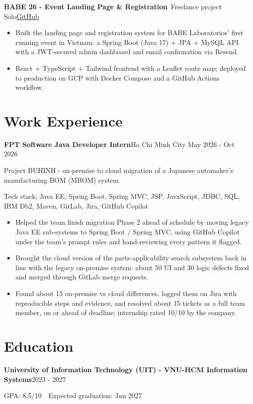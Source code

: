 \documentclass[10pt, a4paper]{article}
\newcommand{\entry}[2]{\textbf{#1}\hfill#2\par}
\newcommand{\subentry}[2]{{\color{MutedText}#1}\hfill{\color{MutedText}#2}\par}
\newcommand{\project}[3]{\textbf{#1}\,{\color{MutedText}\textbar{} #2}\hfill\href{#3}{GitHub}\par}
\newcommand{\techstack}[1]{{\color{MutedText}Tech stack: #1}\par}
\begin{document}
\vspace{2pt}
\project{BABE 26 - Event Landing Page \& Registration}{Freelance project \textbullet{} Solo}{https://github.com/minhphuong150505/landing-page}
\begin{itemize}
  \item Built the landing page and registration system for BABE Laboratorios' first running event in Vietnam: a Spring Boot (Java 17) + JPA + MySQL API with a JWT-secured admin dashboard and email confirmation via Resend.
  \item React + TypeScript + Tailwind frontend with a Leaflet route map; deployed to production on GCP with Docker Compose and a GitHub Actions workflow.
\end{itemize}

\section{Work Experience}
\entry{FPT Software \textbar{} Java Developer Intern}{Ho Chi Minh City \textbar{} May 2026 - Oct 2026}
\subentry{Project BUHINH - on-premise to cloud migration of a Japanese automaker's manufacturing BOM (MBOM) system}{}
\techstack{Java EE, Spring Boot, Spring MVC, JSP, JavaScript, JDBC, SQL, IBM Db2, Maven, GitLab, Jira, GitHub Copilot}
\begin{itemize}
  \item Helped the team finish migration Phase 2 ahead of schedule by moving legacy Java EE sub-systems to Spring Boot / Spring MVC, using GitHub Copilot under the team's prompt rules and hand-reviewing every pattern it flagged.
  \item Brought the cloud version of the parts-applicability search subsystem back in line with the legacy on-premise system: about 50 UI and 30 logic defects fixed and merged through GitLab merge requests.
  \item Found about 15 on-premise vs cloud differences, logged them on Jira with reproducible steps and evidence, and resolved about 15 tickets as a full team member, on or ahead of deadline; internship rated 10/10 by the company.
\end{itemize}

\section{Education}
\entry{University of Information Technology (UIT) - VNU-HCM \textbar{} Information Systems}{2023 - 2027}
GPA: 8.5/10 \,\textbar\, Expected graduation: Jun 2027\par
\end{document}
